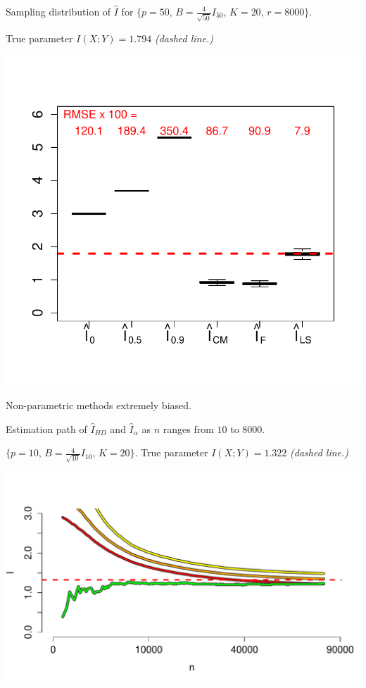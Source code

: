 \documentclass[12pt]{article}
\begin{document}
Sampling distribution of $\hat{I}$ for \small{$\{p = 50$, $B = \frac{4}{\sqrt{50}} I_{50}$, $K = 20$, $r = 8000\}$.}

True parameter $I(X; Y) = 1.794$ \emph{(dashed line.)}
\begin{center}
\includegraphics[scale = 0.5, clip = true, trim = 0 0.5in 0 0.5in]{../info_theory_sims/fig2.pdf}
\end{center}
Non-parametric methods extremely biased.

Estimation path of $\hat{I}_{HD}$ and $\hat{I}_\alpha$ as $n$ ranges from $10$ to $8000$.

\small{$\{p = 10$, $B = \frac{4}{\sqrt{10}} I_{10}$, $K = 20\}$.
True parameter $I(X; Y) = 1.322$ \emph{(dashed line.)}}

\begin{center}
\includegraphics[scale = 0.4]{../info_theory_sims/fig3.pdf}
\end{center}
\end{document}
